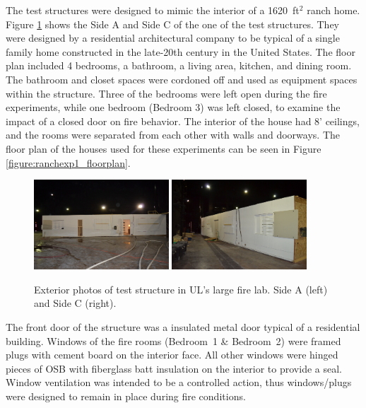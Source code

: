 \documentclass[12pt,oneside]{book}
\begin{document}
The test structures were designed to mimic the interior of a 1620~ft$^2$ ranch home. Figure \ref{fig:test_prop_photo} shows the Side A and Side C of the one of the test structures. They were designed by a residential architectural company to be typical of a single family home constructed in the late-20th century in the United States. The floor plan included 4 bedrooms, a bathroom, a living area, kitchen, and dining room. The bathroom and closet spaces were cordoned off and used as equipment spaces within the structure. Three of the bedrooms were left open during the fire experiments, while one bedroom (Bedroom 3) was left closed, to examine the impact of a closed door on fire behavior. The interior of the house had 8' ceilings, and the rooms were separated from each other with walls and doorways. The floor plan of the houses used for these experiments can be seen in Figure \ref{figure:ranchexp1_floorplan}.

\begin{figure}[H]
\centering
\includegraphics[width=0.45\textwidth]{0_Images/Ranch_Pictures/House_Front.jpg}
\includegraphics[width=0.45\textwidth]{0_Images/Ranch_Pictures/House_Rear.jpg}
\caption[Test Structure - Exterior Photos]{Exterior photos of test structure in UL's large fire lab. Side A (left) and Side C (right).}
\label{fig:test_prop_photo}
\end{figure}

The front door of the structure was a insulated metal door typical of a residential building. Windows of the fire rooms (Bedroom~1 \& Bedroom~2) were framed plugs with cement board on the interior face. All other windows were hinged pieces of OSB with fiberglass batt insulation on the interior to provide a seal. Window ventilation was intended to be a controlled action, thus windows/plugs were designed to remain in place during fire conditions. 
 
\end{document}
